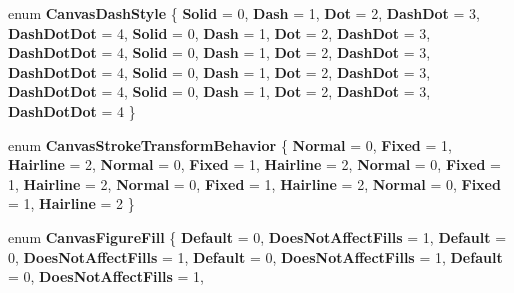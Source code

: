 \begin{DoxyCompactItemize}
enum {\bfseries Canvas\+Dash\+Style} \{ \newline
{\bfseries Solid} = 0, 
{\bfseries Dash} = 1, 
{\bfseries Dot} = 2, 
{\bfseries Dash\+Dot} = 3, 
\newline
{\bfseries Dash\+Dot\+Dot} = 4, 
{\bfseries Solid} = 0, 
{\bfseries Dash} = 1, 
{\bfseries Dot} = 2, 
\newline
{\bfseries Dash\+Dot} = 3, 
{\bfseries Dash\+Dot\+Dot} = 4, 
{\bfseries Solid} = 0, 
{\bfseries Dash} = 1, 
\newline
{\bfseries Dot} = 2, 
{\bfseries Dash\+Dot} = 3, 
{\bfseries Dash\+Dot\+Dot} = 4, 
{\bfseries Solid} = 0, 
\newline
{\bfseries Dash} = 1, 
{\bfseries Dot} = 2, 
{\bfseries Dash\+Dot} = 3, 
{\bfseries Dash\+Dot\+Dot} = 4, 
\newline
{\bfseries Solid} = 0, 
{\bfseries Dash} = 1, 
{\bfseries Dot} = 2, 
{\bfseries Dash\+Dot} = 3, 
\newline
{\bfseries Dash\+Dot\+Dot} = 4
 \}
\item 
\mbox{\label{namespace_microsoft_1_1_graphics_1_1_canvas_1_1_geometry_a79c0c14002e1ebbc20c430497d584867}} 
enum {\bfseries Canvas\+Stroke\+Transform\+Behavior} \{ \newline
{\bfseries Normal} = 0, 
{\bfseries Fixed} = 1, 
{\bfseries Hairline} = 2, 
{\bfseries Normal} = 0, 
\newline
{\bfseries Fixed} = 1, 
{\bfseries Hairline} = 2, 
{\bfseries Normal} = 0, 
{\bfseries Fixed} = 1, 
\newline
{\bfseries Hairline} = 2, 
{\bfseries Normal} = 0, 
{\bfseries Fixed} = 1, 
{\bfseries Hairline} = 2, 
\newline
{\bfseries Normal} = 0, 
{\bfseries Fixed} = 1, 
{\bfseries Hairline} = 2
 \}
\item 
\mbox{\label{namespace_microsoft_1_1_graphics_1_1_canvas_1_1_geometry_aff867f5434d5804c2b0bcc7ada82e275}} 
enum {\bfseries Canvas\+Figure\+Fill} \{ \newline
{\bfseries Default} = 0, 
{\bfseries Does\+Not\+Affect\+Fills} = 1, 
{\bfseries Default} = 0, 
{\bfseries Does\+Not\+Affect\+Fills} = 1, 
\newline
{\bfseries Default} = 0, 
{\bfseries Does\+Not\+Affect\+Fills} = 1, 
{\bfseries Default} = 0, 
{\bfseries Does\+Not\+Affect\+Fills} = 1, 

\end{DoxyCompactItemize}
